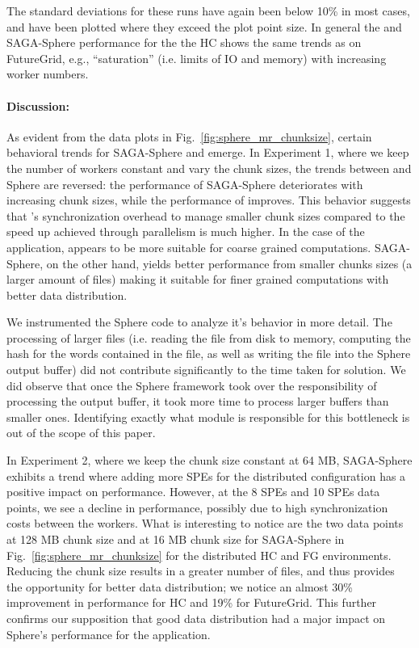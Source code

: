 \documentclass[3p,twocolumn]{elsarticle}
\begin{document}
The standard deviations for these runs have again been below 10\% in
most cases, and have been plotted where they exceed the plot point
size.  In general the \sagamapreduce and SAGA-Sphere performance for
the the HC shows the same trends as on FutureGrid, e.g.,
``saturation'' (i.e. limits of IO and memory) with increasing worker
numbers.


\paragraph{Discussion:}
As evident from the data plots in Fig.~\ref{fig:sphere_mr_chunksize},
certain behavioral trends for SAGA-Sphere and \sagamapreduce emerge.
In Experiment 1, where we keep the number of workers constant and vary
the chunk sizes, the trends between \sagamapreduce and Sphere are
reversed: the performance of SAGA-Sphere deteriorates with increasing
chunk sizes, while the performance of \sagamapreduce improves. This
behavior suggests that \sagamapreduce's synchronization overhead to
manage smaller chunk sizes compared to the speed up achieved through
parallelism is much higher.  In the case of the \wc application,
\sagamapreduce appears to be more suitable for coarse grained
computations. SAGA-Sphere, on the other hand, yields better
performance from smaller chunks sizes (a larger amount of files)
making it suitable for finer grained computations with better data
distribution.

We instrumented the Sphere code to analyze it's behavior in more detail.
The processing of larger files (i.e. reading the file from disk to memory,
computing the hash for the words contained in the file, as
well as writing the file into the Sphere output buffer) did not
contribute significantly to the time taken for solution. We did
observe that once the Sphere framework took over the responsibility
of processing the output buffer, it took more time to process larger
buffers than smaller ones. Identifying exactly what module is
responsible for this bottleneck is out of the scope of this paper.

In Experiment 2, where we keep the chunk size constant at 64 MB,
SAGA-Sphere exhibits a trend where adding more SPEs for the
distributed configuration has a positive impact on
performance. However, at the 8 SPEs and 10 SPEs data points, we see a
decline in performance, possibly due to high synchronization costs
between the workers.  What is interesting to notice are the two data
points at 128 MB chunk size and at 16 MB chunk size for SAGA-Sphere in
Fig.~\ref{fig:sphere_mr_chunksize} for the distributed HC and FG
environments. Reducing the chunk size results in a greater number of
files, and thus provides the opportunity for better data distribution;
we notice an almost 30\% improvement in performance for HC and 19\%
for FutureGrid. This further confirms our supposition that good data
distribution had a major impact on Sphere's performance for the \wc
application.
\end{document}
